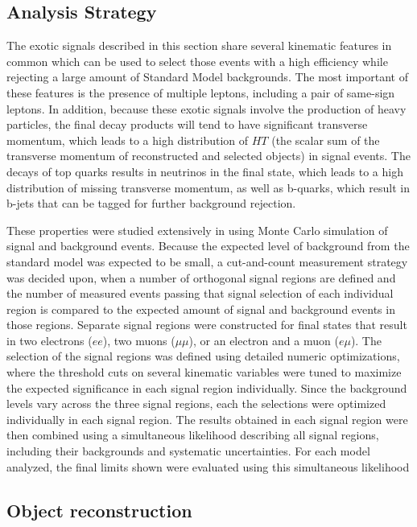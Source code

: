 \subsection{Analysis Strategy}\label{sect:strategy}

The exotic signals described in this section share several kinematic features in common which can be used to select those events with a high efficiency while rejecting a large amount of Standard Model backgrounds.
The most important of these features is the presence of multiple leptons, including a pair of same-sign leptons.
In addition, because these exotic signals involve the production of heavy particles, the final decay products will tend to have significant transverse momentum, which leads to a high distribution of $HT$ (the scalar sum of the transverse momentum of reconstructed and selected objects) in signal events.
The decays of top quarks results in neutrinos in the final state, which leads to a high distribution of missing transverse momentum, as well as b-quarks, which result in b-jets that can be tagged for further background rejection.

These properties were studied extensively in using Monte Carlo simulation of signal and background events.
Because the expected level of background from the standard model was expected to be small, a cut-and-count measurement strategy was decided upon, when a number of orthogonal signal regions are defined and the number of measured events passing that signal selection of each individual region is compared to the expected amount of signal and background events in those regions.
Separate signal regions were constructed for final states that result in two electrons ($ee$), two muons ($\mu \mu$), or an electron and a muon ($e \mu$).
The selection of the signal regions was defined using detailed numeric optimizations, where the threshold cuts on several kinematic variables were tuned to maximize the expected significance in each signal region individually.
Since the background levels vary across the three signal regions, each the selections were optimized individually in each signal region.
The results obtained in each signal region were then combined using a simultaneous likelihood describing all signal regions, including their backgrounds and systematic uncertainties.
For each model analyzed, the final limits shown were evaluated using this simultaneous likelihood


\subsection{Object reconstruction}\label{sect:objects}

